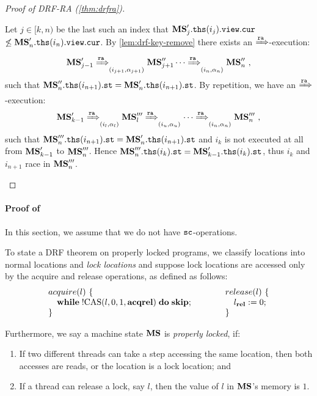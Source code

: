 \begin{proof}[Proof of DRF-RA (\cref{thm:drfra})]
\begin{description}
Let $j \in [k,n)$ be the last such an index that
${\mathbf{MS}}'_{j}.\mathtt{ths}(i_j).\texttt{view}.{\texttt{cur}}$
$\not\leq {\mathbf{MS}}'_{n}.\mathtt{ths}(i_n).\texttt{view}.{\texttt{cur}}$.  By
\cref{lem:drf-key-remove} there exists an $\xRightarrow{\texttt{ra}}$-execution:
\[
{\mathbf{MS}}'_{j-1} \xRightarrow{\texttt{ra}}_{(i_{j+1},\alpha_{j+1})} {\mathbf{MS}}''_{j+1}
\cdots \xRightarrow{\texttt{ra}}_{(i_n,\alpha_n)} {\mathbf{MS}}''_n~,
\]
such that
${\mathbf{MS}}''_n.\mathtt{ths}(i_{n+1}).\texttt{st} = {\mathbf{MS}}'_n.\mathtt{ths}(i_{n+1}).\texttt{st}$.  By
repetition, we have an $\xRightarrow{\texttt{ra}}$-execution:
\[
  {\mathbf{MS}}'_{k-1} \xRightarrow{\texttt{ra}}_{(i_{l},\alpha_{l})} {\mathbf{MS}}'''_{l}
  \xRightarrow{\texttt{ra}}_{(i_{u},\alpha_{u})} \cdots
  \xRightarrow{\texttt{ra}}_{(i_n,\alpha_n)} {\mathbf{MS}}'''_n~,
\]
such that
${\mathbf{MS}}'''_n.\mathtt{ths}(i_{n+1}).\texttt{st} =
{\mathbf{MS}}'_n.\mathtt{ths}(i_{n+1}).\texttt{st}$ and $i_k$ is not executed at all
from ${\mathbf{MS}}'_{k-1}$ to ${\mathbf{MS}}'''_n$.  Hence
${\mathbf{MS}}'''_n.\mathtt{ths}(i_k).\texttt{st} = {\mathbf{MS}}'_{k-1}.\mathtt{ths}(i_k).\texttt{st}$,
thus $i_k$ and $i_{n+1}$ race in ${\mathbf{MS}}'''_n$.  
\end{description}
\end{proof}


\paragraph{Proof of }

In this section, we assume that we do not have ${\texttt{sc}}$-operations.

To state a DRF theorem on properly locked programs, we classify
locations into normal locations and \emph{lock locations} and suppose
lock locations are accessed only by the acquire and release operations, as
defined as follows:
$$\inparaII{
acquire(l)\ \{ \\
\quad \while{!\cas{l}{0}{1}{\acqr\relw}}{\skipc;} \\
\}
}{
release(l)\ \{ \\
\quad l_{\relw} := 0; \\
\}
}
$$

Furthermore, we say a machine state ${\mathbf{MS}}$
is \emph{properly locked}, if:
\begin{enumerate}
\item If two different threads can take a step
  accessing the same location, then both accesses are reads, or the
  location is a lock location; and
\item If a thread can release a lock, say $l$, then the value
  of $l$ in ${\mathbf{MS}}$'s memory is $1$.
\end{enumerate}

